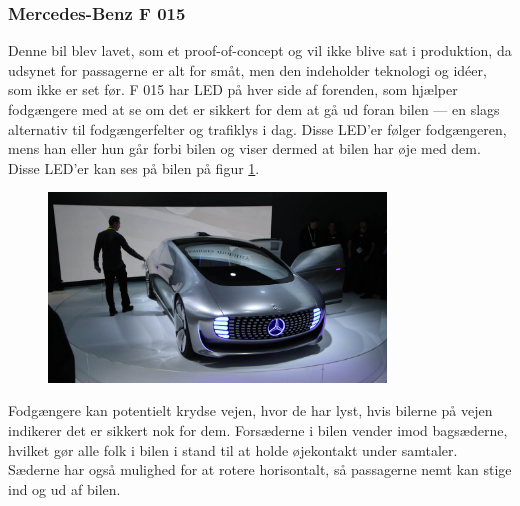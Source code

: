 \subsubsection{Mercedes-Benz F 015}
Denne bil blev lavet, som et proof-of-concept og vil ikke blive sat i produktion, da udsynet for passagerne er alt for småt, men den indeholder teknologi og idéer, som ikke er set før. F 015 har LED på hver side af forenden, som hjælper fodgængere med at se om det er sikkert for dem at gå ud foran bilen --- en slags alternativ til fodgængerfelter og trafiklys i dag. Disse LED'er følger fodgængeren, mens han eller hun går forbi bilen og viser dermed at bilen har øje med dem. Disse LED'er kan ses på bilen på figur \ref{fig:Mercedes-Benz_F_015}.
\begin{figure}[h!]
	\centering
	\includegraphics[width=0.8\textwidth]{images/150106_0422_ces.jpg}{}
	\label{fig:Mercedes-Benz_F_015}
\end{figure}
\FloatBarrier
Fodgængere kan potentielt krydse vejen, hvor de har lyst, hvis bilerne på vejen indikerer det er sikkert nok for dem. Forsæderne i bilen vender imod bagsæderne, hvilket gør alle folk i bilen i stand til at holde øjekontakt under samtaler. Sæderne har også mulighed for at rotere horisontalt, så passagerne nemt kan stige ind og ud af bilen.
